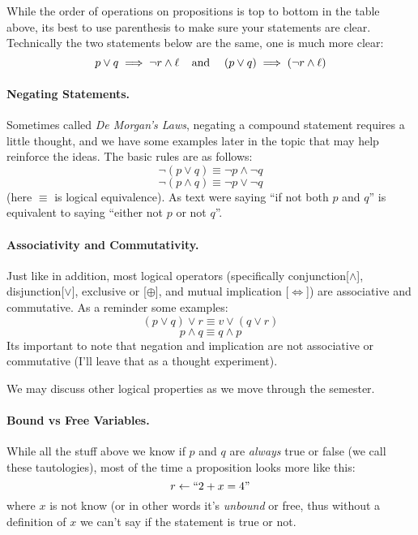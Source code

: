 \documentclass[11pt, oneside]{article}   	%
\begin{document}
While the order of operations on propositions is top to bottom in the table above, 
its best to use parenthesis to make sure your statements are clear. 
Technically the two statements below are the same, one is much more clear:
\[
p \vee q \implies \neg r \wedge \ell \;\;\;\; \textnormal{and}\;\;\;\; \left(p\vee q\right) \implies \left(\neg r \wedge \ell\right) 
\]

\paragraph{Negating Statements.}
Sometimes called \emph{De Morgan's Laws}, negating a compound statement requires a little thought, 
and we have some examples later in the topic that may help reinforce the ideas. 
The basic rules are as follows:
\[ \neg\left(p \vee q\right) \equiv \neg p \wedge \neg q\]
\[ \neg\left(p \wedge q\right) \equiv \neg p \vee \neg q\]
(here $\equiv$ is logical equivalence).
As text were saying ``if not both $p$ and $q$'' is equivalent to saying ``either not $p$ or not $q$''.

\paragraph{Associativity and Commutativity.}
Just like in addition, most logical operators (specifically conjunction[$\wedge$], disjunction[$\vee$], exclusive or [$\oplus$], and mutual implication [$\iff$]) are associative and commutative.
As a reminder some examples:
\begin{equation}
\left(p \vee q\right) \vee r \equiv v \vee \left(q \vee r\right) \tag{associativity}
\end{equation}
\begin{equation}
p \wedge q \equiv q \wedge p \tag{commutativity}
\end{equation}
Its important to note that negation and implication are not associative or commutative (I'll leave that as a thought experiment).

We may discuss other logical properties as we move through the semester.  

\paragraph{Bound vs Free Variables.} While all the stuff above we know if $p$ and $q$ are \textit{always} true or false (we call these tautologies), 
most of the time a proposition looks more like this: 
\[ r \leftarrow \textnormal{``}2+x=4\textnormal{''}\]
where $x$ is not know (or in other words it's \emph{unbound} or free, thus without a definition of $x$ we can't say if the statement is true or not. 
\end{document}
